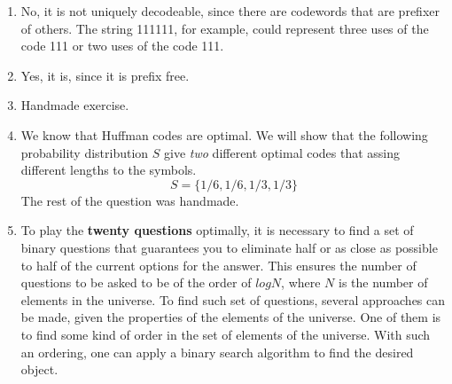 \documentclass{article}
\begin{document}
\begin{enumerate}
	\item No, it is not uniquely decodeable, since there are codewords that are prefixer of others. The string 111111, for example, could represent three uses of the code 111 or two uses of the code 111.
	\item Yes, it is, since it is prefix free.
	\item Handmade exercise.
	\item We know that Huffman codes are optimal. We will show that the following probability distribution \(S\) give \textit{two} different optimal codes that assing different lengths to the symbols.
	      \[S = \{1/6,1/6,1/3,1/3\}\]
	      The rest of the question was handmade.

	\item To play the \textbf{twenty questions} optimally, it is necessary to find a set of binary questions that guarantees you to eliminate half or as close as possible to half of the current options for the answer. This ensures the number of questions to be asked to be of the order of \(log N\), where \(N\) is the number of elements in the universe. To find such set of questions, several approaches can be made, given the properties of the elements of the universe. One of them is to find some kind of order in the set of elements of the universe. With such an ordering, one can apply a binary search algorithm to find the desired object.
\end{enumerate}


\end{document}
